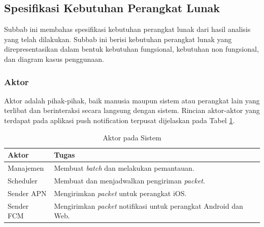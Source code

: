 \subsection{Spesifikasi Kebutuhan Perangkat Lunak}
\par Subbab ini membahas spesifikasi kebutuhan perangkat lunak dari hasil analisis yang telah dilakukan. Subbab ini berisi kebutuhan perangkat lunak yang direpresentasikan dalam bentuk kebutuhan fungsional, kebutuhan non fungsional, dan diagram kasus penggunaan.

\subsubsection{Aktor}
\par Aktor adalah pihak-pihak, baik manusia maupun sistem atau perangkat lain yang terlibat dan berinteraksi secara langsung dengan sistem. Rincian aktor-aktor yang terdapat pada aplikasi push notification terpusat dijelaskan pada Tabel \ref{t:aktor}.
\begin{longtable}{|p{2cm}|p{7cm}|}
    \caption{Aktor pada Sistem} \label{t:aktor} \\ \hline
    \rowcolor{lightgray} Aktor & Tugas \\ \hline
    Manajemen & Membuat \textit{batch} dan melakukan pemantauan. \\ \hline
    \endhead
    Scheduler & Membuat dan menjadwalkan pengiriman \textit{packet}. \\ \hline
    Sender APN & Mengirimkan \textit{packet} untuk perangkat iOS. \\ \hline
    Sender FCM & Mengirimkan \textit{packet} notifikasi untuk perangkat Android dan Web. \\ \hline
\end{longtable}

